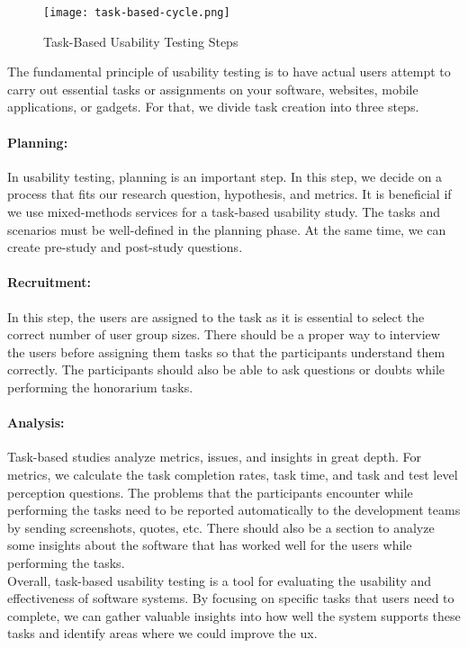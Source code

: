 \begin{figure}[htbp!]
  \centering    
  \texttt{[image: task-based-cycle.png]}
  \caption[Tasks Steps]{Task-Based Usability Testing Steps}
  \label{fig:background:taskssteps}
\end{figure}
The fundamental principle of usability testing is to have actual users attempt to carry out essential tasks or assignments on your software, websites, mobile applications, or gadgets.
For that, we divide task creation into three steps.
\paragraph{Planning:}
In usability testing, planning is an important step. 
In this step, we decide on a process that fits our research question, hypothesis, and metrics.  
It is beneficial if we use mixed-methods services for a task-based usability study.
The tasks and scenarios must be well-defined in the planning phase. At the same time, we can create pre-study and post-study questions. 
\paragraph{Recruitment:} 
In this step, the users are assigned to the task as it is essential to select the correct number of user group sizes.
There should be a proper way to interview the users before assigning them tasks so that the participants understand them correctly. 
The participants should also be able to ask questions or doubts while performing the honorarium tasks. 
\paragraph{Analysis:}
Task-based studies analyze metrics, issues, and insights in great depth.
For metrics, we calculate the task completion rates, task time, and task and test level perception questions.
The problems that the participants encounter while performing the tasks need to be reported automatically to the development teams by sending screenshots, quotes, etc. 
There should also be a section to analyze some insights about the software that has worked well for the users while performing the tasks.\\

Overall, task-based usability testing is a tool for evaluating the usability and effectiveness of software systems. 
By focusing on specific tasks that users need to complete, we can gather valuable insights into how well the system supports these tasks and identify areas where we could improve the \ac{ux}.
\clearpage

